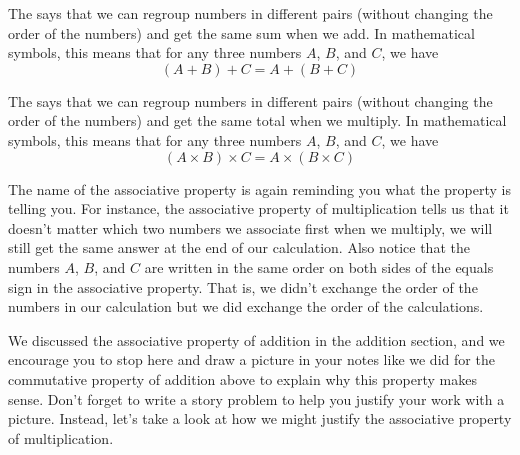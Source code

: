 \documentclass{ximera}
\begin{document}
\begin{definition}
The  says that we can regroup numbers in different pairs (without changing the order of the numbers) and get the same sum when we add. In mathematical symbols, this means that for any three numbers $A$, $B$, and $C$, we have
\[
(A + B) + C = A + (B+C)
\]
\end{definition}

\begin{definition}
The  says that we can regroup numbers in different pairs (without changing the order of the numbers) and get the same total when we multiply. In mathematical symbols, this means that for any three numbers $A$, $B$, and $C$, we have
\[
(A \times B) \times C = A \times (B\times C)
\]
\end{definition}

The name of the associative property is again reminding you what the property is telling you. For instance, the associative property of multiplication tells us that it doesn't matter which two numbers we associate first when we multiply, we will still get the same answer at the end of our calculation. Also notice that the numbers $A$, $B$, and $C$ are written in the same order on both sides of the equals sign in the associative property. That is, we didn't exchange the order of the numbers in our calculation but we did exchange the order of the calculations.

We discussed the associative property of addition in the addition section, and we encourage you to stop here and draw a picture in your notes like we did for the commutative property of addition above to explain why this property makes sense. Don't forget to write a story problem to help you justify your work with a picture. Instead, let's take a look at how we might justify the associative property of multiplication.
\end{document}
